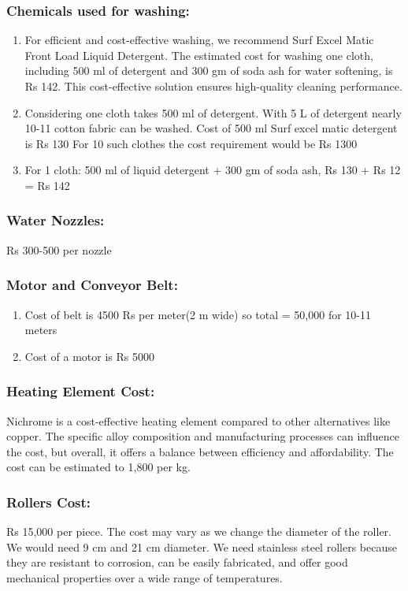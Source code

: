\documentclass[12pt]{article} %
\begin{document}
   \subsubsection{Chemicals used for washing:} 
   \begin{enumerate}
   \item For efficient and cost-effective washing, we recommend Surf Excel Matic Front Load Liquid Detergent. The estimated cost for washing one cloth, including 500 ml of detergent and 300 gm of soda ash for water softening, is Rs 142. This cost-effective solution ensures high-quality cleaning performance.

\item Considering one cloth takes 500 ml of detergent.
With 5 L of detergent nearly 10-11 cotton fabric can be washed.
Cost of 500 ml Surf excel matic detergent is Rs 130
For 10 such clothes the cost requirement would be Rs 1300
\item For 1 cloth: 500 ml of liquid detergent + 300 gm of soda ash,
Rs 130 + Rs 12 = Rs 142

\end{enumerate}

\subsubsection{Water Nozzles:} Rs 300-500 per nozzle
\subsubsection{Motor and Conveyor Belt:} 
   \begin{enumerate}
   \item Cost of belt is 4500 Rs per meter(2 m wide) so total = 50,000 for 10-11 meters


\item Cost of a motor is Rs 5000

\end{enumerate}
\subsubsection{Heating Element Cost:} Nichrome is a cost-effective heating element compared to other alternatives like copper. The specific alloy composition and manufacturing processes can influence the cost, but overall, it offers a balance between efficiency and affordability. The cost can be estimated to 1,800 per kg.


\subsubsection{Rollers Cost:} Rs 15,000 per piece. The cost may vary as we change the diameter of the roller. We would need 9 cm and 21 cm diameter. We need stainless steel rollers because they are resistant to corrosion, can be easily fabricated, and offer good mechanical properties over a wide range of temperatures. 
\end{document}

